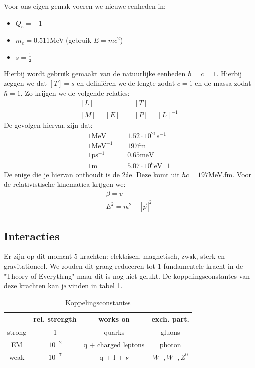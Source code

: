\documentclass[../main.tex]{subfiles}
\begin{document}
Voor ons eigen gemak voeren we nieuwe eenheden in:
\begin{itemize}
    \item $Q_e = -1$
    \item $m_e = 0.511$MeV (gebruik $E=mc^2$)
    \item $s=\frac{1}{2}$
\end{itemize}
Hierbij wordt gebruik gemaakt van de natuurlijke eenheden $\hbar = c = 1$. Hierbij zeggen we dat $[T]=s$ en definiëren we de lengte zodat $c=1$ en de massa zodat $\hbar = 1$. Zo krijgen we de volgende relaties:
\begin{equation}
    \begin{aligned}
        \label{eq:nat_units}
        [L]&=[T]\\
        [M]=[E]&=[P]=[L]^{-1}
    \end{aligned}
\end{equation}
De gevolgen hiervan zijn dat:
\begin{equation}
    \begin{aligned}
        \label{eq:nat_units_gevolgen}
        1 \text{MeV} &= 1.52 \cdot 10^{21} s^{-1}\\
        1 \text{MeV}^{-1} &= 197\text{fm}\\
        1 \text{ps}^{-1} &= 0.65 \text{meV}\\
        1 \text{m} &= 5.07\cdot 10^6 \text{eV}^-1
    \end{aligned}
\end{equation}
De enige die je hiervan onthoudt is de 2de. Deze komt uit $\hbar c = 197$MeV.fm. Voor de relativistische kinematica krijgen we:
\begin{equation}
    \begin{aligned}
        \label{eq:rel_kin}
        \beta = v\\
        E^2 = m^2 + |\vec{p}|^2
    \end{aligned}
\end{equation}

\subsection{Interacties}%
\label{sub:interacties}

Er zijn op dit moment 5 krachten: elektrisch, magnetisch, zwak, sterk en gravitationeel. We zouden dit graag reduceren tot 1 fundamentele kracht in de "Theory of Everything" maar dit is nog niet gelukt. De koppelingsconstantes van deze krachten kan je vinden in tabel \ref{tab:coupling_constants}.
\begin{table}[h]
    \centering
    \caption{Koppelingsconstantes}
    \label{tab:coupling_constants}
    \begin{tabular}{cccc}
                & rel. strength & works on              & exch. part. \\
        \hline
        strong  & 1             & quarks                & gluons \\
        EM      & $10^{-2}$     & q + charged leptons   & photon \\
        weak    & $10^{-7}$     & q + l + $\nu$         & $W^+,W^-,Z^0$
    \end{tabular}
\end{table}
\end{document}
